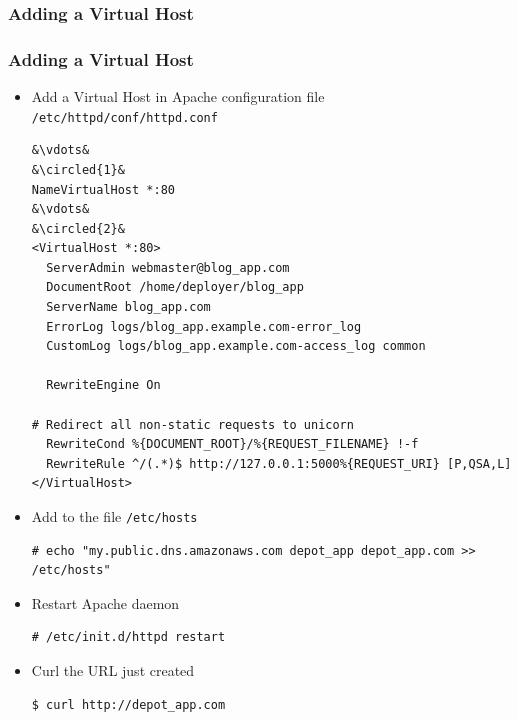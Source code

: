 \documentclass{beamer}
\newcommand*\circled[1]{\tikz[baseline=(char.base)]{
            \node[shape=circle,draw,inner sep=2pt] (char) {#1};}}
\begin{document}
\subsubsection{Adding a Virtual Host}
\begin{frame}
\frametitle{Adding a Virtual Host}
\begin{itemize}
 \item  Add a Virtual Host in Apache configuration file \texttt{/etc/httpd/conf/httpd.conf}

\lstset{language=shell, escapechar=&, numbers=left}
\begin{lstlisting}
&\vdots&
&\circled{1}&
NameVirtualHost *:80
&\vdots&
&\circled{2}&
<VirtualHost *:80>
  ServerAdmin webmaster@blog_app.com
  DocumentRoot /home/deployer/blog_app
  ServerName blog_app.com
  ErrorLog logs/blog_app.example.com-error_log
  CustomLog logs/blog_app.example.com-access_log common

  RewriteEngine On

# Redirect all non-static requests to unicorn
  RewriteCond %{DOCUMENT_ROOT}/%{REQUEST_FILENAME} !-f 
  RewriteRule ^/(.*)$ http://127.0.0.1:5000%{REQUEST_URI} [P,QSA,L]
</VirtualHost>
\end{lstlisting}

\item Add to the file \texttt{/etc/hosts}
\lstset{language=shell, escapechar=&}
\begin{lstlisting}
# echo "my.public.dns.amazonaws.com depot_app depot_app.com >> /etc/hosts" 
\end{lstlisting}

\item Restart Apache daemon

\lstset{language=shell, escapechar=!}
\begin{lstlisting}[escapechar=!]
# /etc/init.d/httpd restart
\end{lstlisting}

\item Curl the URL just created

\begin{lstlisting}[escapechar=!]
$ curl http://depot_app.com
\end{lstlisting} 

\end{itemize}

\end{frame}
\end{document}
